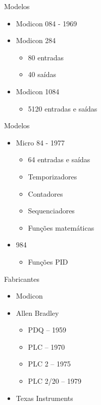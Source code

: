 \documentclass[aspectratio=169,
				xcolor=table]{beamer}
\begin{document}
	\begin{frame}{Modelos}
		\begin{itemize}
			\item Modicon 084 - 1969
			\item Modicon 284
			\begin{itemize}
				\item 80 entradas
				\item 40 saídas
			\end{itemize}
			\item Modicon 1084
			\begin{itemize}
				\item 5120 entradas e saídas
			\end{itemize}
		\end{itemize}
	\end{frame}	
	
	\begin{frame}{Modelos}
	
		\begin{itemize}
			\item Micro 84 - 1977
			\begin{itemize}
				\item 64 entradas e saídas
				\item Temporizadores
				\item Contadores
				\item Sequenciadores
				\item Funções matemáticas
			\end{itemize}
			\vspace{1em}
			\item 984
			\begin{itemize}
				\item Funções PID
			\end{itemize}
		\end{itemize}
		
	\end{frame}
	
	\begin{frame}{Fabricantes}
		\begin{itemize}
			\item Modicon
			\vspace{1em}
			\item Allen Bradley
			\begin{itemize}
				\item PDQ – 1959
				\item PLC – 1970
				\item PLC 2 – 1975
				\item PLC 2/20 – 1979

			\end{itemize}
			\vspace{1em}
			\item Texas Instruments
			
		\end{itemize}
	\end{frame}
\end{document}
